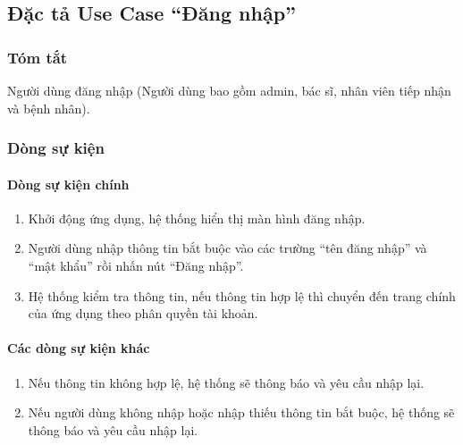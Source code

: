 \subsection{Đặc tả Use Case ``Đăng nhập''}

\subsubsection{Tóm tắt}
Người dùng đăng nhập (Người dùng bao gồm admin, bác sĩ, nhân viên tiếp nhận và bệnh nhân).

\subsubsection{Dòng sự kiện}
\paragraph{\textbf{Dòng sự kiện chính}}
\begin{enumerate}
    \item Khởi động ứng dụng, hệ thống hiển thị màn hình đăng nhập.
    \item Người dùng nhập thông tin bắt buộc vào các trường ``tên đăng nhập'' và ``mật khẩu'' rồi nhấn nút ``Đăng nhập''.
    \item Hệ thống kiểm tra thông tin, nếu thông tin hợp lệ thì chuyển đến trang chính của ứng dụng theo phân quyền tài khoản.
\end{enumerate}

\paragraph{\textbf{Các dòng sự kiện khác}}
\begin{enumerate}
    \item Nếu thông tin không hợp lệ, hệ thống sẽ thông báo và yêu cầu nhập lại. 
    \item Nếu người dùng không nhập hoặc nhập thiếu thông tin bắt buộc, hệ thống sẽ thông báo và yêu cầu nhập lại.
\end{enumerate}

